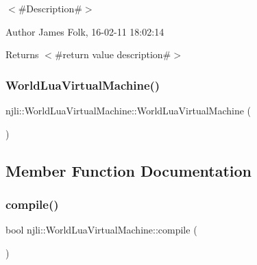 $<$\#\+Description\#$>$ 

\begin{DoxyAuthor}{Author}
James Folk, 16-\/02-\/11 18\+:02\+:14
\end{DoxyAuthor}
\begin{DoxyReturn}{Returns}
$<$\#return value description\#$>$ 
\end{DoxyReturn}
\mbox{\label{classnjli_1_1_world_lua_virtual_machine_ae1cb82578d5b11df857c605468bb539f}} 
\subsubsection{\texorpdfstring{World\+Lua\+Virtual\+Machine()}{WorldLuaVirtualMachine()}\hspace{0.1cm}{\footnotesize\ttfamily [2/2]}}
{\footnotesize\ttfamily njli\+::\+World\+Lua\+Virtual\+Machine\+::\+World\+Lua\+Virtual\+Machine (\begin{DoxyParamCaption}\item[{const \mbox{\hyperlink{classnjli_1_1_world_lua_virtual_machine}{World\+Lua\+Virtual\+Machine}} \&}]{ }\end{DoxyParamCaption})\hspace{0.3cm}{\ttfamily [private]}}



\subsection{Member Function Documentation}
\mbox{\label{classnjli_1_1_world_lua_virtual_machine_adafe224987a62685972c4ee97a3e9ac4}} 
\subsubsection{\texorpdfstring{compile()}{compile()}}
{\footnotesize\ttfamily bool njli\+::\+World\+Lua\+Virtual\+Machine\+::compile (\begin{DoxyParamCaption}{ }\end{DoxyParamCaption})}



